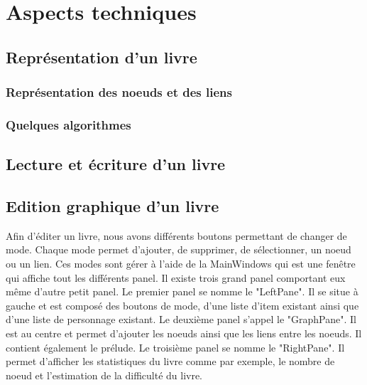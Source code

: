 \chapter{Aspects techniques}

	\section{Représentation d'un livre}

		\subsection{Représentation des noeuds et des liens}

		\subsection{Quelques algorithmes}



	\section{Lecture et écriture d'un livre}


	\section{Edition graphique d'un livre}
		Afin d'éditer un livre, nous avons différents boutons permettant de changer de mode. Chaque mode permet d'ajouter, de supprimer, de sélectionner, un noeud ou un lien. Ces modes sont gérer à l'aide de la MainWindows qui est une fenêtre qui affiche tout les différents panel. Il existe trois grand panel comportant eux même d'autre petit panel. Le premier panel se nomme le "LeftPane". Il se situe à gauche et est composé des boutons de mode, d'une liste d'item existant ainsi que d'une liste de personnage existant. Le deuxième panel s'appel le "GraphPane". Il est au centre et permet d'ajouter les noeuds ainsi que les liens entre les noeuds. Il contient également le prélude. Le troisième panel se nomme le "RightPane". Il permet d'afficher les statistiques du livre comme par exemple, le nombre de noeud et l'estimation de la difficulté du livre.\\

